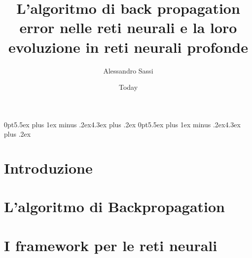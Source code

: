 \documentclass [12pt ,a4paper ,twoside ,openright ]{book}
\begin{document}
\title{L'algoritmo di back propagation error nelle reti neurali e la loro evoluzione in reti neurali profonde}
\author{Alessandro Sassi}
\date{Today}

\titlespacing*{\section}
{0pt}{5.5ex plus 1ex minus .2ex}{4.3ex plus .2ex}
\titlespacing*{\subsection}
{0pt}{5.5ex plus 1ex minus .2ex}{4.3ex plus .2ex}




\chapter*{Introduzione}

\chapter*{L'algoritmo di Backpropagation }

\chapter*{I framework per le reti neurali}




\end{document}
